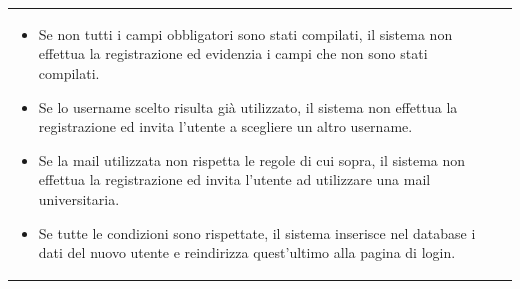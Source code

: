 \documentclass[10pt,a4paper]{report}
\begin{document}
\begin{tabular}{lp{}}
\begin{enumerate}
			\begin{itemize}
				\item Se non tutti i campi obbligatori sono stati compilati, il sistema non effettua la registrazione ed evidenzia i campi che non sono stati compilati.
				\item Se lo username scelto risulta già utilizzato, il sistema non effettua la registrazione ed invita l'utente a scegliere un altro username.
				\item Se la mail utilizzata non rispetta le regole di cui sopra, il sistema non effettua la registrazione ed invita l'utente ad utilizzare una mail universitaria.
				\item Se tutte le condizioni sono rispettate, il sistema inserisce nel database i dati del nuovo utente e reindirizza quest'ultimo alla pagina di login.
			\end{itemize}
		\end{enumerate}
	\end{tabular}
	
\end{document}
